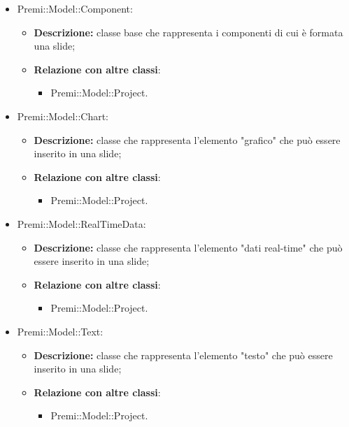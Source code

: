 \begin{itemize}
		\item Premi::Model::Component:
		\begin{itemize}
			\item \textbf{Descrizione:} classe base che rappresenta i componenti di cui è formata una \gls{slide};
			\item \textbf{Relazione con altre classi}:
			\begin{itemize}
				\item Premi::Model::Project.
			\end{itemize}
		\end{itemize}
		
		\item Premi::Model::Chart:
		\begin{itemize}
			\item \textbf{Descrizione:} classe che rappresenta l'elemento "grafico" che può essere inserito in una \gls{slide};
			\item \textbf{Relazione con altre classi}:
			\begin{itemize}
				\item Premi::Model::Project.
			\end{itemize}
		\end{itemize}
		
		\item Premi::Model::RealTimeData:
		\begin{itemize}
			\item \textbf{Descrizione:} classe che rappresenta l'elemento "dati real-time" che può essere inserito in una \gls{slide};
			\item \textbf{Relazione con altre classi}:
			\begin{itemize}
				\item Premi::Model::Project.
			\end{itemize}
		\end{itemize}
		
		\item Premi::Model::Text:
		\begin{itemize}
			\item \textbf{Descrizione:} classe che rappresenta l'elemento "testo" che può essere inserito in una \gls{slide};
			\item \textbf{Relazione con altre classi}:
			\begin{itemize}
				\item Premi::Model::Project.
			\end{itemize}
		\end{itemize}
		

\end{itemize}
